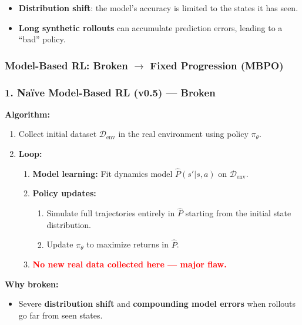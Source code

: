 \documentclass[12pt]{article}
\begin{document}
\begin{itemize}
    \item \textbf{Distribution shift}: the model's accuracy is limited to the states it has seen.
    \item \textbf{Long synthetic rollouts} can accumulate prediction errors, leading to a ``bad'' policy.
\end{itemize}

\subsubsection{Model-Based RL: Broken $\rightarrow$ Fixed Progression (MBPO)}

\subsubsection*{1. Naïve Model-Based RL (v0.5) --- Broken}
\textbf{Algorithm:}
\begin{enumerate}
    \item Collect initial dataset $\mathcal{D}_{\text{env}}$ in the real environment using policy $\pi_\theta$.
    \item \textbf{Loop:}
    \begin{enumerate}
        \item \textbf{Model learning:} Fit dynamics model $\hat{P}(s'|s,a)$ on $\mathcal{D}_{\text{env}}$.
        \item \textbf{Policy updates:}
        \begin{enumerate}
            \item Simulate full trajectories entirely in $\hat{P}$ starting from the initial state distribution.
            \item Update $\pi_\theta$ to maximize returns in $\hat{P}$.
        \end{enumerate}
        \item \textbf{\textcolor{red}{No new real data collected here — major flaw.}}
    \end{enumerate}
\end{enumerate}

\textbf{Why broken:}
\begin{itemize}
    \item Severe \textbf{distribution shift} and \textbf{compounding model errors} when rollouts go far from seen states.
\end{itemize}
\end{document}
